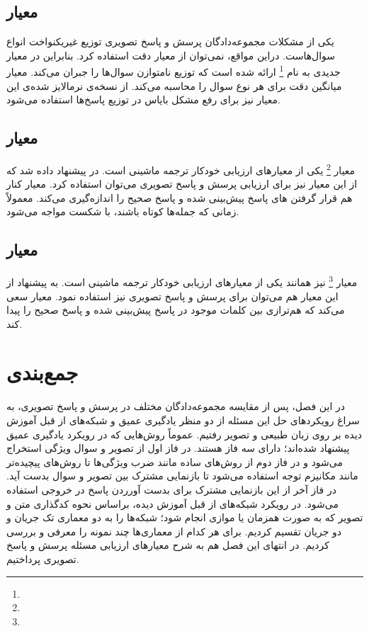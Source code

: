 \subsection{ معیار }

		یکی از مشکلات مجموعه‌دادگان پرسش و پاسخ تصویری توزیع غیریکنواخت انواع سوال‌هاست. دراین مواقع، نمی‌توان از معیار دقت استفاده کرد. بنابراین  در 
	\cite{kafle2017analysis}
		 معیار جدیدی به نام 
	\footnote{}
		ارائه شده است که توزیع نامتوازن سوال‌ها را جبران می‌کند. معیار 
	میانگین دقت برای هر نوع سوال را محاسبه می‌کند. از نسخه‌ی نرمالایز شده‌ی این معیار نیز برای رفع مشکل بایاس در توزیع پاسخ‌ها استفاده می‌شود.


\subsection{معیار }
معیار
		\cite{papineni2002bleu}
		\footnote{}
		یکی از معیارهای ارزیابی خودکار ترجمه ماشینی است. در
		\cite{gurari2018vizwiz}
		 پیشنهاد داده شد که از این معیار نیز برای ارزیابی پرسش و پاسخ تصویری می‌توان استفاده کرد. معیار 
		کنار هم قرار گرفتن 
		های پاسخ پیش‌‌بینی شده و پاسخ صحیح را اندازه‌گیری می‌کند. معمولاً
	زمانی که جمله‌ها کوتاه باشند، با شکست مواجه می‌‌شود.
		


\subsection{معیار }
معیار
		\cite{denkowski2014meteor}
		\footnote{}
		نیز همانند
	یکی از معیارهای ارزیابی خودکار ترجمه ماشینی است. به پیشنهاد 
	\cite{gurari2018vizwiz}
	 از این معیار هم می‌توان برای پرسش و پاسخ تصویری نیز استفاده نمود. معیار 
		سعی می‌کند که هم‌ترازی بین کلمات موجود در پاسخ پیش‌بینی شده و پاسخ صحیح را پیدا کند.
\section{جمع‌بندی}
در این فصل، پس از مقایسه مجموعه‌دادگان مختلف در پرسش و پاسخ تصویری، به سراغ رویکرد‌های حل این مسئله از دو منظر یادگیری عمیق و شبکه‌های از قبل آموزش دیده بر روی زبان طبیعی و تصویر رفتیم. عموماً روش‌هایی که در رویکرد یادگیری عمیق پیشنهاد شده‌اند؛ دارای سه فاز هستند. در فاز اول از تصویر و سوال ویژگی استخراج می‌شود و در فاز دوم از روش‌های ساده مانند ضرب ویژگی‌ها تا روش‌های پیچیده‌تر مانند مکانیزم توجه استفاده می‌شود تا بازنمایی مشترک بین تصویر و سوال بدست آید. در فاز آخر از این بازنمایی مشترک برای بدست آورردن پاسخ در خروجی استفاده می‌شود. در رویکرد شبکه‌های از قبل آموزش دیده، براساس نحوه کدگذاری متن  و تصویر که به صورت همزمان یا موازی انجام ‌شود؛ شبکه‌‌ها را به دو معماری تک جریان و دو جریان تقسیم کردیم. برای هر کدام از معماری‌ها چند نمونه را معرفی و بررسی  کردیم. در انتهای این فصل هم به شرح معیار‌های ارزیابی مسئله پرسش و پاسخ تصویری پرداختیم.


